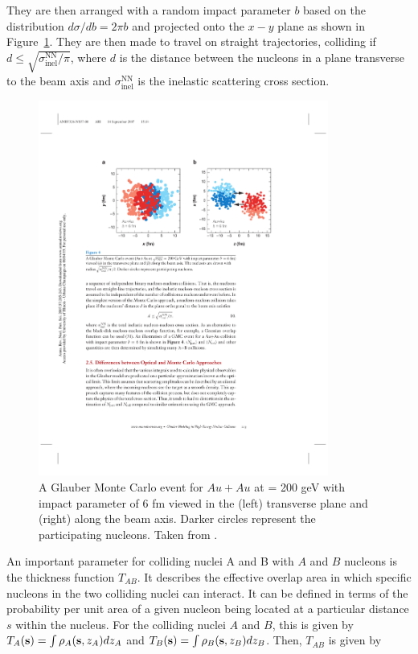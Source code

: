 They are then arranged with a random impact parameter $b$ based on the distribution $d\sigma/d b = 2\pi b$ and projected onto the $x-y$ plane as shown in Figure~\ref{fig:glauberMC}. They are then made to travel on straight trajectories, colliding if $d \leq \sqrt{\sigma_{\mathrm{inel}}^{\mathrm{NN}}/ \pi}$, where $d$ is the distance between the nucleons in a plane transverse to the beam axis and $\sigma_{\mathrm{inel}}^{\mathrm{NN}}$ is the inelastic scattering cross section. \cite{doi:10.1146/annurev.nucl.57.090506.123020, Alver:2008aq}

\begin{figure}[htbp]
\begin{center}
\includegraphics[width=0.85\textwidth]{figures/theory/glauberMC}
\caption{A Glauber Monte Carlo event for $Au+Au$ at \sqrtsnn = 200 geV with impact parameter of 6 fm viewed in the (left) transverse plane and (right) along the beam axis. Darker circles represent the participating nucleons. Taken from \cite{doi:10.1146/annurev.nucl.57.090506.123020}. }
\label{fig:glauberMC}
\end{center}
\end{figure}



An important parameter for colliding nuclei A and B with $A$ and $B$ nucleons is the thickness function $T_{AB}$. It describes the effective overlap area in which specific nucleons in the two colliding nuclei can interact. It can be defined in terms of the probability per unit area of a given nucleon being located at a particular distance $s$ within the nucleus. For the colliding nuclei $A$ and $B$, this is given by $T_{A}({\bf{s}}) = \int \rho_A ({\bf{s}}, z_A) dz_{A}$ and $T_{B}({\bf{s}}) = \int \rho_B ({\bf{s}}, z_B) dz_{B}$. Then, $T_{AB}$ is given by

